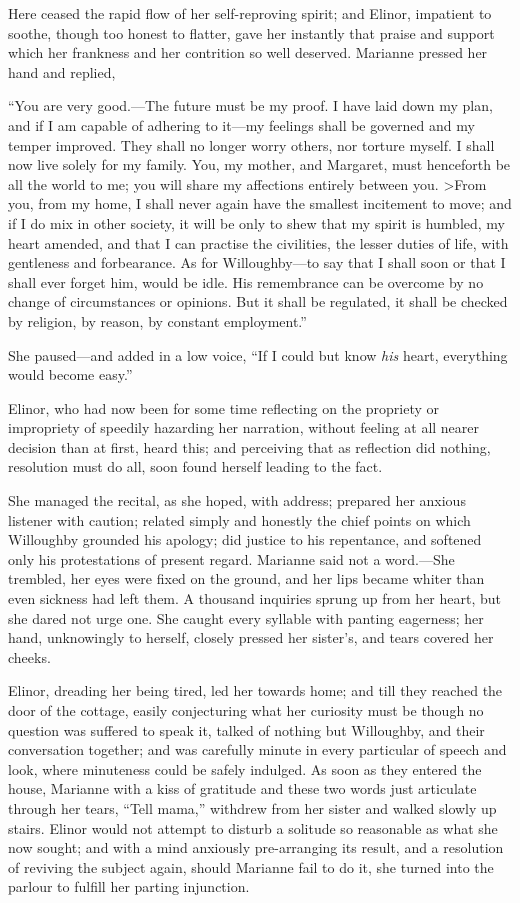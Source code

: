 \documentclass{article}
\begin{document}
Here ceased the rapid flow of her self-reproving spirit;
and Elinor, impatient to soothe, though too honest
to flatter, gave her instantly that praise and support
which her frankness and her contrition so well deserved.
Marianne pressed her hand and replied,

``You are very good.---The future must be my proof.
I have laid down my plan, and if I am capable of adhering
to it---my feelings shall be governed and my temper improved.
They shall no longer worry others, nor torture myself.
I shall now live solely for my family.  You, my mother,
and Margaret, must henceforth be all the world to me;
you will share my affections entirely between you.
>From you, from my home, I shall never again have the smallest
incitement to move; and if I do mix in other society,
it will be only to shew that my spirit is humbled,
my heart amended, and that I can practise the civilities,
the lesser duties of life, with gentleness and forbearance.
As for Willoughby---to say that I shall soon or that I shall
ever forget him, would be idle.  His remembrance can be overcome
by no change of circumstances or opinions.  But it shall
be regulated, it shall be checked by religion, by reason,
by constant employment.''

She paused---and added in a low voice, ``If I could
but know \emph{his} heart, everything would become easy.''

Elinor, who had now been for some time reflecting
on the propriety or impropriety of speedily hazarding
her narration, without feeling at all nearer decision than
at first, heard this; and perceiving that as reflection
did nothing, resolution must do all, soon found herself
leading to the fact.

She managed the recital, as she hoped, with address;
prepared her anxious listener with caution; related simply
and honestly the chief points on which Willoughby
grounded his apology; did justice to his repentance,
and softened only his protestations of present regard.
Marianne said not a word.---She trembled, her eyes
were fixed on the ground, and her lips became whiter
than even sickness had left them.  A thousand inquiries
sprung up from her heart, but she dared not urge one.
She caught every syllable with panting eagerness; her hand,
unknowingly to herself, closely pressed her sister's, and
tears covered her cheeks.

Elinor, dreading her being tired, led her towards home;
and till they reached the door of the cottage,
easily conjecturing what her curiosity must be
though no question was suffered to speak it, talked of
nothing but Willoughby, and their conversation together;
and was carefully minute in every particular of speech
and look, where minuteness could be safely indulged.
As soon as they entered the house, Marianne with a kiss
of gratitude and these two words just articulate through
her tears, ``Tell mama,'' withdrew from her sister and
walked slowly up stairs.  Elinor would not attempt
to disturb a solitude so reasonable as what she now sought;
and with a mind anxiously pre-arranging its result,
and a resolution of reviving the subject again,
should Marianne fail to do it, she turned into the parlour
to fulfill her parting injunction.
\end{document}
